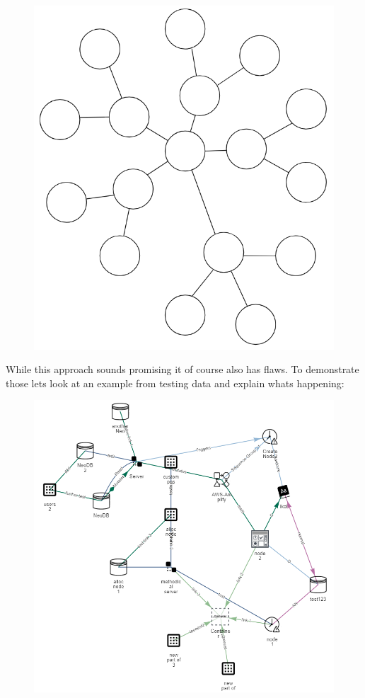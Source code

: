 \begin{figure}[H]
\centering
\includegraphics[scale=.4]{Bilder/FlowerDistEx.png}
\end{figure}

While this approach sounds promising it of course also has flaws. To demonstrate those lets look at an example from testing data and explain whats happening:

\begin{figure}[H]
\label{ex:TreeBad}
\centering
\includegraphics[scale=.55]{Bilder/FlowerExBad.png}
\end{figure}

